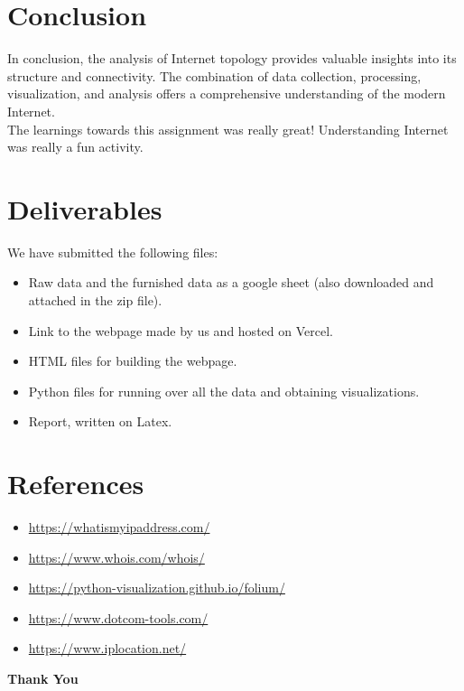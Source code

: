 \documentclass{article}
\begin{document}
\section{Conclusion}
In conclusion, the analysis of Internet topology provides valuable insights into its structure and connectivity. The combination of data collection, processing, visualization, and analysis offers a comprehensive understanding of the modern Internet.\\
The learnings towards this assignment was really great! Understanding Internet was really a fun activity.

\section{Deliverables}
We have submitted the following files:
\begin{itemize}
\item Raw data and the furnished data as a google sheet (also downloaded and attached in the zip file).
\item Link to the webpage made by us and hosted on Vercel.
\item HTML files for building the webpage.
\item Python files for running over all the data and obtaining visualizations.
\item Report, written on Latex.
\end{itemize}

\section{References}
\begin{itemize}
\item \url{https://whatismyipaddress.com/}
\item \url{https://www.whois.com/whois/}
\item \url{https://python-visualization.github.io/folium/}
\item \url{https://www.dotcom-tools.com/}
\item \url{https://www.iplocation.net/}
\end{itemize}

\vspace{1em}

\begin{center}
\Large\textbf{Thank You}
\end{center}
\end{document}
